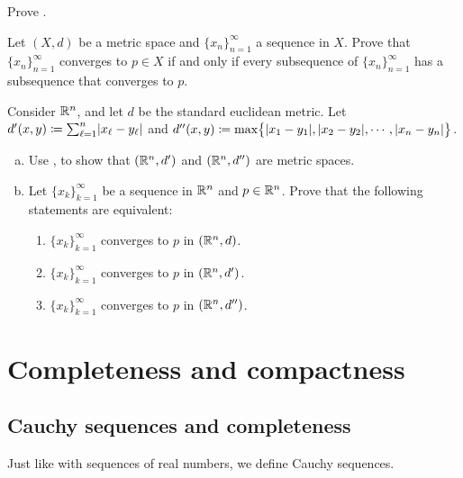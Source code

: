 \begin{exercise}
Prove .
\end{exercise}

\begin{exercise}
Let $(X,d)$ be a metric space and $\{ x_n \}_{n=1}^\infty$ a sequence in $X$.
Prove that $\{ x_n \}_{n=1}^\infty$ converges to $p \in X$
if and only if
every subsequence of $\{ x_n \}_{n=1}^\infty$ has a subsequence that
converges to $p$.
\end{exercise}

\begin{exercise}
Consider ${\mathbb{R}}^n$, and let $d$ be the standard euclidean metric.
Let $d'(x,y) \coloneqq \sum_{\ell=1}^n \lvert {x_\ell-y_\ell} \rvert$ and
$d''(x,y) \coloneqq \max \bigl\{
\lvert {x_1-y_1} \rvert,\lvert {x_2-y_2} \rvert,\cdots,\lvert {x_n-y_n} \rvert
\bigr\}$.
\begin{enumerate}[a)]
\item
Use , to show that
$({\mathbb{R}}^n,d')$ and
$({\mathbb{R}}^n,d'')$ are metric spaces.
\item
Let $\{ x_k \}_{k=1}^\infty$ be a sequence in ${\mathbb{R}}^n$ and $p \in {\mathbb{R}}^n$.
Prove that the following statements are equivalent:
\begin{enumerate}[(1)]
\item
$\{ x_k \}_{k=1}^\infty$ converges to $p$ in $({\mathbb{R}}^n,d)$.
\item
$\{ x_k \}_{k=1}^\infty$ converges to $p$ in $({\mathbb{R}}^n,d')$.
\item
$\{ x_k \}_{k=1}^\infty$ converges to $p$ in $({\mathbb{R}}^n,d'')$.
\end{enumerate}
\end{enumerate}
\end{exercise}


\sectionnewpage
\section{Completeness and compactness}
\label{sec:metcompact}



\subsection{Cauchy sequences and completeness}

Just like with sequences of real numbers, we define Cauchy sequences.

